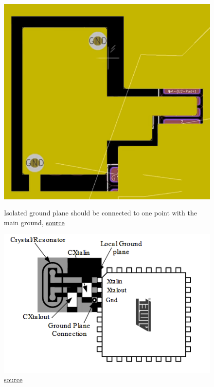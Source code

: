 \documentclass[final]{cubedoc}
\begin{document}
	
	\begin{figure}[h!]
		\centering
		\begin{minipage}[b]{0.3\textwidth}
			\includegraphics[width=\textwidth]{assets/isolated_gnd.png}
			\caption{Isolated ground plane should be connected to one point with the main ground, \href{https://www.youtube.com/watch?v=t5phi3nT8OU&t=4940s}{source}}
		\end{minipage}
		\hfill
		\begin{minipage}[b]{0.3\textwidth}
			\includegraphics[width=\textwidth]{assets/layout_clock.png}
			\caption{\href{http://ww1.microchip.com/downloads/en/DeviceDoc/Atmel-8128-Best-Practices-for-the-PCB-Layout-of-Oscillators_ApplicationNote_AVR186.pdf}{source}}
		\end{minipage}
	\end{figure}
	
\end{document}
